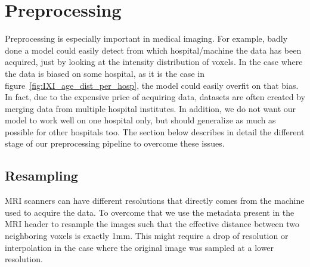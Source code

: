 \section{Preprocessing}
Preprocessing is especially important in medical imaging. For example, badly done a model could easily detect from which hospital/machine the data has been acquired, just by looking at the intensity distribution of voxels. In the case where the data is biased on some hospital, as it is the case in figure~\ref{fig:IXI_age_dist_per_hosp},  the model could easily overfit on that bias. In fact, due to the expensive price of acquiring data, datasets are often created by merging data from multiple hospital institutes. In addition, we do not want our model to work well on one hospital only, but should generalize as much as possible for other hospitals too. The section below describes in detail the different stage of our preprocessing pipeline to overcome these issues.


\subsection{Resampling}
MRI scanners can have different resolutions that directly comes from the machine used to acquire the data. To overcome that we use the metadata present in the MRI header to resample the images such that the effective distance between two neighboring voxels is exactly 1mm. This might require a drop of resolution or interpolation in the case where the original image was sampled at a lower resolution.


